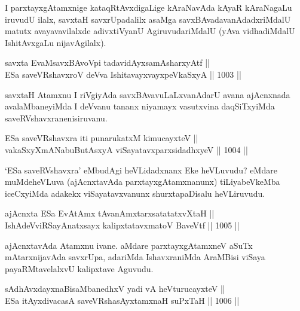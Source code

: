 \begin{artha}
I parxtayxgAtamxnige kataqRtAvxdigaLige kAraNavAda kAyaR kAraNagaLu iruvudU ilalx, savxtaH savxrUpadalilx asaMga savxBAvadavanAdadxriMdalU matutx avayavavilalxde adivxtiVyanU AgiruvudariMdalU (yAva vidhadiMdalU IshitAvxgaLu nijavAgilalx).
\end{artha}

\begin{shl}
savxta EvaMsavxBAvoV\s pi tadavidAyxsamAsharxyAtf || \\
ESa saveVRshavxroV deVva IshitavayxvayxpeVkaSxyA \hfill || 1003 ||  
\end{shl}

\begin{artha}
savxtaH Atamxnu I riVgiyAda savxBAvavuLaLxvanAdarU avana ajAcnxnada avalaMbaneyiMda I deVvanu tananx niyamayx vasutxvina daqSiTxyiMda saveRVshavxranenisiruvanu.
\end{artha}


\begin{shl}
ESa saveVRshavxra iti punarukatxM kimucayxteV || \\
vakaSxyXmANabuButAsxyA viSayatavxparxsidadhxyeV \hfill || 1004 ||  
\end{shl}

\begin{artha}
`ESa saveRVshavxra' eMbudAgi heVLidadxnanx Eke heVLuvudu? eMdare muMdeheVLuva (ajAcnxtavAda parxtayxgAtamxnanunx) tiLiyabeVkeMba iceCxyiMda adakekx viSayatavxvanunx shurxtapaDisalu heVLiruvudu.
\end{artha}

\begin{shl}
ajAcnxta ESa EvA\s \s tAmx tAvanAmxtarxsatatatxvXtaH || \\
IshAdeVviRSayAnatxsayx kalipxtatavxmatoV BaveVtf \hfill || 1005 ||  
\end{shl}

\begin{artha}
ajAcnxtavAda Atamxnu ivane. aMdare parxtayxgAtamxneV aSuTx mAtarxnijavAda savxrUpa, adariMda IshavxraniMda AraMBisi viSaya payaRMtavelalxvU kalipxtave Aguvudu.
\end{artha}

\begin{shl}
sAdhAvxdayxnaBisaMbanedhxV yadi vA heVturucayxteV || \\
ESa itAyxdivacasA saveVRshasAyx\s \s tamxnaH suPxTaH \hfill || 1006 ||  
\end{shl}

